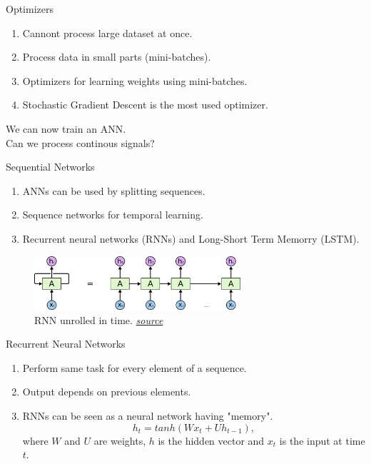 \documentclass[handout]{beamer}
\begin{document}
\begin{frame}{Optimizers}
  \begin{enumerate}
    \item Cannont process large dataset at once.
    \item Process data in small parts (mini-batches).
    \item Optimizers for learning weights using mini-batches.
    \item Stochastic Gradient Descent is the most used optimizer.
  \end{enumerate}
\end{frame}

\begin{frame}{}
  \center
  \Large{\color{blue}We can now train an ANN. \\
  Can we process continous signals?}
\end{frame}

\begin{frame}{Sequential Networks}
  \begin{enumerate}
    \item ANNs can be used by splitting sequences.
    \item Sequence networks for temporal learning.
    \item Recurrent neural networks (RNNs) and Long-Short Term Memorry (LSTM).
  \end{enumerate}
  \begin{center}
    \begin{figure}
    \includegraphics[width=0.65\linewidth, height=2cm]{images/rnn}
    \caption{RNN unrolled in time. \href{https://towardsdatascience.com/introduction-to-recurrent-neural-network-27202c3945f3}{\color{blue}\textit{source}}}
    \end{figure}
  \end{center}
\end{frame}

\begin{frame}{Recurrent Neural Networks}
  \begin{enumerate}
    \item Perform same task for every element of a sequence.
    \item Output depends on previous elements.
    \item RNNs can be seen as a neural network having "memory".
    \begin{equation}
        h_t = tanh(Wx_t+Uh_{t-1}),
    \end{equation}
    where $W$ and $U$ are weights, $h$ is the hidden vector and $x_t$ is the input at time $t$.
  \end{enumerate}

\end{frame}
\end{document}

